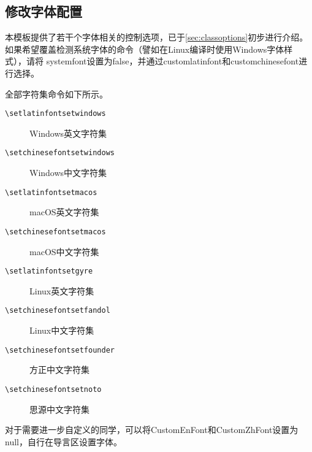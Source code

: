 \subsection{修改字体配置}

本模板提供了若干个字体相关的控制选项，已于\cref{sec:classoptions}初步进行介绍。如果希望覆盖检测系统字体的命令（譬如在Linux编译时使用Windows字体样式），请将
systemfont设置为false，并通过customlatinfont和customchinesefont进行选择。

全部字符集命令如下所示。

\begin{description}
    \item[\texttt{\textbackslash set\textunderscore latin\textunderscore fontset\textunderscore windows}] Windows英文字符集
    \item[\texttt{\textbackslash set\textunderscore chinese\textunderscore fontset\textunderscore windows}] Windows中文字符集
    \item[\texttt{\textbackslash set\textunderscore latin\textunderscore fontset\textunderscore macos}] macOS英文字符集
    \item[\texttt{\textbackslash set\textunderscore chinese\textunderscore fontset\textunderscore macos}] macOS中文字符集
    \item[\texttt{\textbackslash set\textunderscore latin\textunderscore fontset\textunderscore gyre}] Linux英文字符集
    \item[\texttt{\textbackslash set\textunderscore chinese\textunderscore fontset\textunderscore fandol}] Linux中文字符集
    \item[\texttt{\textbackslash set\textunderscore chinese\textunderscore fontset\textunderscore founder}] 方正中文字符集
    \item[\texttt{\textbackslash set\textunderscore chinese\textunderscore fontset\textunderscore noto}] 思源中文字符集
\end{description}

对于需要进一步自定义的同学，可以将CustomEnFont和CustomZhFont设置为null，自行在导言区设置字体。
